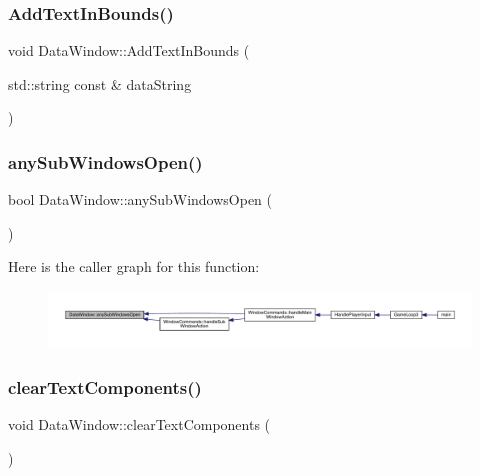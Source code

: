 \subsubsection{\texorpdfstring{Add\+Text\+In\+Bounds()}{AddTextInBounds()}}
{\footnotesize\ttfamily void Data\+Window\+::\+Add\+Text\+In\+Bounds (\begin{DoxyParamCaption}\item[{std\+::string const \&}]{data\+String }\end{DoxyParamCaption})}

\mbox{\label{class_data_window_a141dab549c8f1e91304990ff1547476c}} 
\subsubsection{\texorpdfstring{any\+Sub\+Windows\+Open()}{anySubWindowsOpen()}}
{\footnotesize\ttfamily bool Data\+Window\+::any\+Sub\+Windows\+Open (\begin{DoxyParamCaption}{ }\end{DoxyParamCaption})}

Here is the caller graph for this function\+:
\nopagebreak
\begin{figure}[H]
\begin{center}
\leavevmode
\includegraphics[width=350pt]{class_data_window_a141dab549c8f1e91304990ff1547476c_icgraph}
\end{center}
\end{figure}
\mbox{\label{class_data_window_a2f7b8defc928dcf530149a82bdd16d53}} 
\subsubsection{\texorpdfstring{clear\+Text\+Components()}{clearTextComponents()}}
{\footnotesize\ttfamily void Data\+Window\+::clear\+Text\+Components (\begin{DoxyParamCaption}{ }\end{DoxyParamCaption})}

